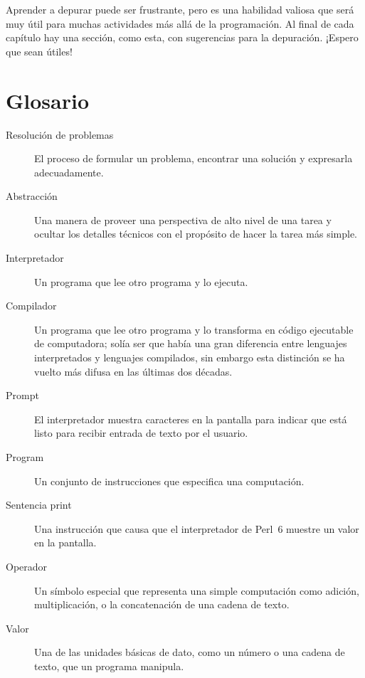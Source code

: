 Aprender a depurar puede ser frustrante, pero es una habilidad valiosa
que será muy útil para muchas actividades más allá de la programación. 
Al final de cada capítulo hay una sección, como esta, con sugerencias para la
depuración. ¡Espero que sean útiles!


\section{Glosario}

\begin{description}

\item[Resolución de problemas]  El proceso de formular un problema, 
encontrar una solución y expresarla adecuadamente.

\item[Abstracción] Una manera de proveer una perspectiva de alto nivel
de una tarea y ocultar los detalles técnicos con el propósito de hacer 
la tarea más simple.

\item[Interpretador]  Un programa que lee otro programa y lo ejecuta.

\item[Compilador]  Un programa que lee otro programa y lo transforma en código ejecutable
de computadora; solía ser que había una gran diferencia entre lenguajes
interpretados y lenguajes compilados, sin embargo esta distinción se ha vuelto
más difusa en las últimas dos décadas.

\item[Prompt] El interpretador muestra caracteres en la pantalla para indicar 
que está listo para recibir entrada de texto por el usuario.

\item[Program] Un conjunto de instrucciones que especifica una computación.

\item[Sentencia print]  Una instrucción que causa que el interpretador de Perl~6
muestre un valor en la pantalla. 

\item[Operador]  Un símbolo especial que representa una simple computación como
adición, multiplicación, o la concatenación de una cadena de texto.

\item[Valor]  Una de las unidades básicas de dato, como un número o una
cadena de texto, que un programa manipula.


\end{description}

